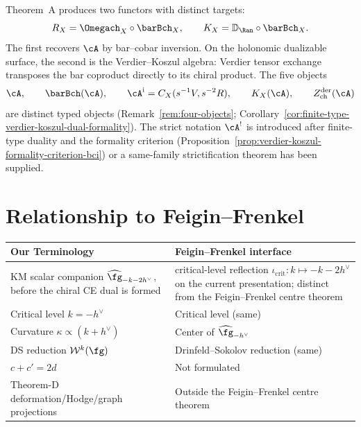 \begin{remark}
\label{rem:concordance-rx-kx}
%
%
Theorem~A produces two functors with distinct targets:
\[
R_X = \Omegach_X \circ \barBch_X,\qquad
K_X=\mathbb{D}_{\Ran}\circ\barBch_X .
\]
The first recovers $\cA$ by bar--cobar inversion.  On the holonomic
dualizable surface, the second is the Verdier--Koszul algebra: Verdier
tensor exchange transposes the bar coproduct directly to its chiral
product.  The five objects
\[
\cA,\qquad \barBch(\cA),\qquad
\cA^{\mathrm{i}}=C_X(s^{-1}V,s^{-2}R),\qquad
K_X(\cA),\qquad
Z^{\mathrm{der}}_{\mathrm{ch}}(\cA)
\]
are distinct typed objects
\textup{(}Remark~\ref{rem:four-objects};
Corollary~\ref{cor:finite-type-verdier-koszul-dual-formality}\textup{)}.
The strict notation $\cA^!$ is introduced after finite-type duality
and the formality criterion
\textup{(}Proposition~\ref{prop:verdier-koszul-formality-criterion-bci}\textup{)}
or a same-family strictification theorem has been supplied.
\end{remark}

\section{Relationship to Feigin--Frenkel}

\begin{tabular}{>{\raggedright\arraybackslash}p{}>{\raggedright\arraybackslash}p{}}
\textbf{Our Terminology} & \textbf{Feigin--Frenkel interface} \\
\hline
KM scalar companion $\widehat{\fg}_{-k-2h^\vee}$, before the chiral CE dual is formed & critical-level reflection $\iota_{\mathrm{crit}}\colon k \mapsto -k - 2h^\vee$ on the current presentation; distinct from the Feigin--Frenkel centre theorem \\
Critical level $k = -h^\vee$ & Critical level (same) \\
Curvature $\kappa \propto (k + h^\vee)$ & Center of $\widehat{\fg}_{-h^\vee}$ \\
DS reduction $\mathcal{W}^k(\fg)$ & Drinfeld--Sokolov reduction (same) \\
$c + c' = 2d$ & Not formulated \\
Theorem-D deformation/Hodge/graph projections & Outside the
Feigin--Frenkel centre theorem \\
\end{tabular}

